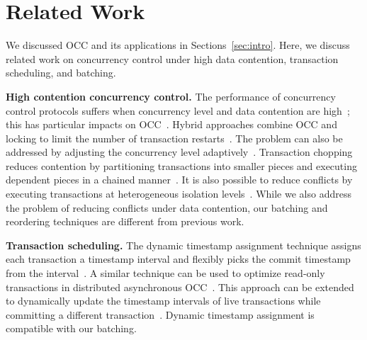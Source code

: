 \section{Related Work}\label{sec:relwork}

We discussed OCC and its applications in Sections~\ref{sec:intro}. 
Here, we discuss related work on concurrency control under high data contention, transaction scheduling, and batching. 

{\bf High contention concurrency control.}
The performance of concurrency control protocols suffers when concurrency level and data contention are high~\cite{franaszek1985limitations}; this has particular impacts on OCC~\cite{agrawal1987concurrency}. Hybrid approaches combine OCC and locking to limit the number of transaction restarts~\cite{thomasian1998distributed,yu1992analysis}. The problem can also be addressed by adjusting the concurrency level adaptively~\cite{helal1993adaptive}. Transaction chopping reduces contention by partitioning transactions into smaller pieces and executing dependent pieces in a chained manner~\cite{mu2014extracting,shasha1995transaction,xie2015high}. It is also possible to reduce conflicts by executing transactions at heterogeneous isolation levels~\cite{xie2014salt,xie2015high}. While we also address the problem of reducing conflicts under data contention, our batching and reordering techniques are different from previous work.

{\bf Transaction scheduling.}
The dynamic timestamp assignment technique assigns each transaction a timestamp interval and flexibly picks the commit timestamp from the interval~\cite{bayer1982dynamic}. A similar technique can be used to optimize read-only transactions in distributed asynchronous OCC~\cite{ding2015centiman}. This approach can be extended to dynamically update the timestamp intervals of live transactions while committing a different transaction~\cite{boksenbaum1987concurrent}. Dynamic timestamp assignment is compatible with our batching.


